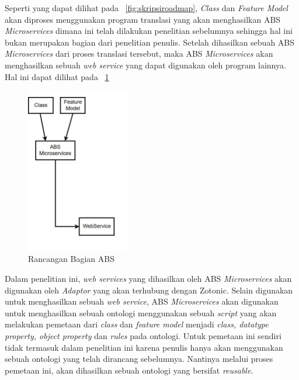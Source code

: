 Seperti yang dapat dilihat pada \pic~\ref{fig:skripsiroadmap}, \textit{Class} dan \textit{Feature Model} akan diproses menggunakan program translasi yang akan menghasilkan ABS \textit{Microservices} dimana ini telah dilakukan penelitian sebelumnya sehingga hal ini bukan merupakan bagian dari penelitian penulis. Setelah dihasilkan sebuah ABS \textit{Microservices} dari proses translasi tersebut, maka ABS \textit{Microservices} akan menghasilkan sebuah \textit{web service} yang dapat digunakan oleh program lainnya. Hal ini dapat dilihat pada \pic~\ref{fig:ABSRoadmap}

\begin{figure}
	\centering
	\includegraphics[width=0.4\textwidth]
	{pics/partABSRoadmap.jpg}
	\caption{Rancangan Bagian ABS}
	\label{fig:ABSRoadmap}
\end{figure}
\vspace{-0.3cm}

Dalam penelitian ini, \textit{web services} yang dihasilkan oleh ABS \textit{Microservices} akan digunakan oleh \textit{Adaptor} yang akan terhubung dengan Zotonic. Selain digunakan untuk menghasilkan sebuah \textit{web service}, ABS \textit{Microservices} akan digunakan untuk menghasilkan sebuah ontologi menggunakan sebuah \textit{script} yang akan melakukan pemetaan dari \textit{class} dan \textit{feature model} menjadi \textit{class, datatype property, object property} dan \textit{rules} pada ontologi. Untuk pemetaan ini sendiri tidak termasuk dalam penelitian ini karena penulis hanya akan menggunakan sebuah ontologi yang telah dirancang sebelumnya. Nantinya melalui proses pemetaan ini, akan dihasilkan sebuah ontologi yang bersifat \textit{reusable}.

